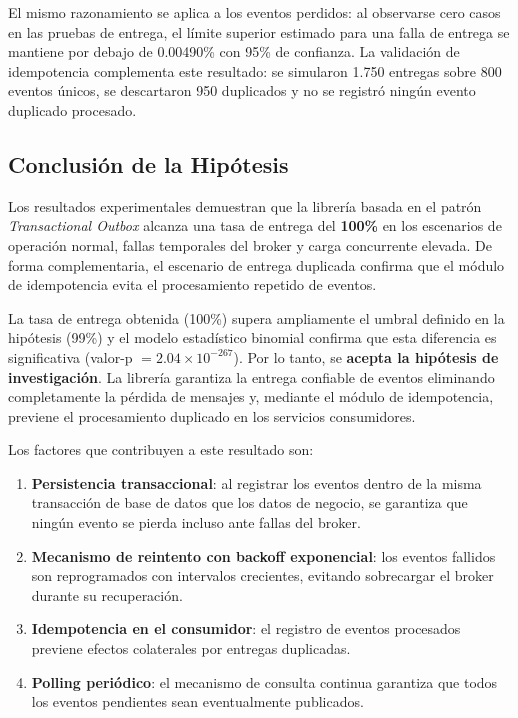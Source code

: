 El mismo razonamiento se aplica a los eventos perdidos: al observarse cero casos en las pruebas de entrega, el límite superior estimado para una falla de entrega se mantiene por debajo de 0.00490\% con 95\% de confianza. La validación de idempotencia complementa este resultado: se simularon 1.750 entregas sobre 800 eventos únicos, se descartaron 950 duplicados y no se registró ningún evento duplicado procesado.

\subsection{Conclusión de la Hipótesis}

Los resultados experimentales demuestran que la librería basada en el patrón \textit{Transactional Outbox} alcanza una tasa de entrega del \textbf{100\%} en los escenarios de operación normal, fallas temporales del broker y carga concurrente elevada. De forma complementaria, el escenario de entrega duplicada confirma que el módulo de idempotencia evita el procesamiento repetido de eventos.

La tasa de entrega obtenida (100\%) supera ampliamente el umbral definido en la hipótesis (99\%) y el modelo estadístico binomial confirma que esta diferencia es significativa (valor-p $= 2.04 \times 10^{-267}$). Por lo tanto, se \textbf{acepta la hipótesis de investigación}. La librería garantiza la entrega confiable de eventos eliminando completamente la pérdida de mensajes y, mediante el módulo de idempotencia, previene el procesamiento duplicado en los servicios consumidores.

Los factores que contribuyen a este resultado son:

\begin{enumerate}
    \item \textbf{Persistencia transaccional}: al registrar los eventos dentro de la misma transacción de base de datos que los datos de negocio, se garantiza que ningún evento se pierda incluso ante fallas del broker.
    \item \textbf{Mecanismo de reintento con backoff exponencial}: los eventos fallidos son reprogramados con intervalos crecientes, evitando sobrecargar el broker durante su recuperación.
    \item \textbf{Idempotencia en el consumidor}: el registro de eventos procesados previene efectos colaterales por entregas duplicadas.
    \item \textbf{Polling periódico}: el mecanismo de consulta continua garantiza que todos los eventos pendientes sean eventualmente publicados.
\end{enumerate}
